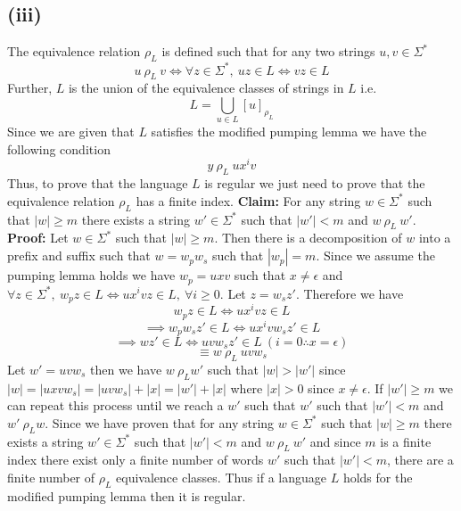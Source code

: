 \documentclass[12pt]{article}
\begin{document}
\subsection*{(iii)}
The equivalence relation $\rho_L$ is defined such that
for any two strings $u, v \in \Sigma^*$
$$ u\ \rho_L\ v \iff \forall z \in \Sigma^*,\ uz \in L \iff vz \in L$$
Further, $L$ is the union of the equivalence classes of strings in $L$ i.e.
$$L = \bigcup _{u\in L} [u]_{\rho_L}$$
Since we are given that $L$ satisfies the modified pumping lemma we have the
following condition
$$y\ \rho_L\ ux^iv$$
Thus, to prove that the language $L$ is regular we just need to prove that the
equivalence relation $\rho_L$ has a finite index.
\newline
\textbf{Claim: } For any string $w \in \Sigma^*$ such that $|w| \ge m$ there
exists a string $w' \in \Sigma^*$ such that $|w'| < m$ and $w\ \rho_L\ w'$.
\newline
\textbf{Proof: } Let $w \in \Sigma^*$ such that $|w| \ge m$. Then there is a
decomposition of $w$ into a prefix and suffix such that $w = w_pw_s$ such that
$|w_p| = m$. Since we assume the pumping lemma holds we have $w_p = uxv$ such
that $x \neq \epsilon$ and
$\forall z \in \Sigma^*,\ w_pz \in L \iff ux^ivz \in L,\ \forall i \ge 0$.
Let $z = w_sz'$. Therefore we have
$$ w_pz \in L \iff ux^ivz \in L$$
$$\implies w_pw_sz' \in L \iff ux^ivw_sz' \in L$$
$$\implies wz' \in L \iff uvw_sz' \in L\ (i = 0 \therefore x = \epsilon)$$
$$\equiv w\ \rho_L\ uvw_s$$
Let $w' = uvw_s$ then we have $w\ \rho_L w'$ such that $|w| > |w'|$ since
$|w| = |uxvw_s| = |uvw_s|+|x| = |w'| +|x|$ where $|x| > 0$ since
$x \neq \epsilon$. If $|w'| \ge m$ we can repeat this process until we reach a
$w'$ such that $w'$ such that $|w'| < m$ and $w'\ \rho_L w$.
Since we have proven that for any string $w \in \Sigma^*$ such that $|w| \ge m$
there exists a string $w' \in \Sigma^*$ such that $|w'| < m$ and $w\ \rho_L\ w'$
and since $m$ is a finite index there exist only a finite number of words $w'$
such that $|w'| < m$, there are a finite number of $\rho_L$ equivalence classes.
Thus if a language $L$ holds for the modified pumping lemma then it is regular.
\end{document}
